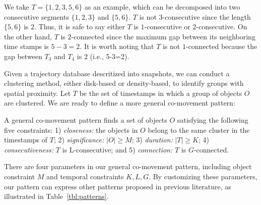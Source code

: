 We take $T=\{1,2,3,5,6\}$ as an example, which can be decomposed into two consecutive segments $\{1,2,3\}$ and $\{5,6\}$. $T$ is not $3$-consecutive since the length $\{5,6\}$ is $2$. Thus, it is safe to say either $T$ is $1$-consecutive or $2$-consecutive. On the other hand, $T$ is $2$-connected since the maximum gap between its neighboring time stamps is $5-3=2$. It is worth noting that $T$ is not $1$-connected because the gap between $T_3$ and $T_4$ is 2 (i.e., 5-3=2).

Given a trajectory database descritized into snapshots, we can conduct a clustering method, either disk-based or density-based, to identify groups with spatial proximity. Let $T$ be the set of timestamps in which a group of objects $O$ are clustered. We are ready to define a more general co-movement pattern:
\begin{definition}
A general co-movement pattern finds a set of objects $O$ satisfying the following five constraints: 1) \textit{closeness:} the objects in $O$ belong to the same cluster in the timestamps of $T$; 2) \textit{significance:} $|O| \geq M$; 3) \textit{duration:} $|T| \geq K$; 4) \textit{consecutiveness:} $T$ is L-consecutive; and 5) \textit{connection:} $T$ is $G$-connected.

\end{definition}
There are four parameters in our general co-movement pattern, including object constraint $M$ and temporal constraints $K,L,G$. By customizing these parameters, our pattern can 
express other patterns proposed in previous literature, as illustrated in Table~\ref{tbl:patterns}. 
